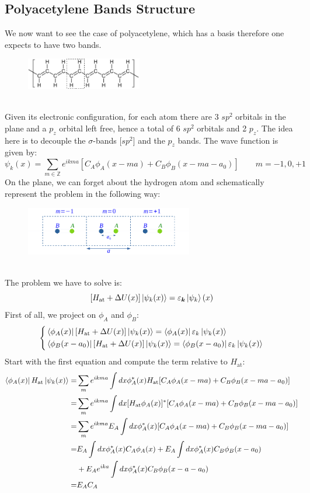 \documentclass[10.75pt,a4paper,openright,bottom=2cm]{article}
\renewcommand{\Vec}[1]{\boldsymbol{#1}}
\begin{document}
\subsection{Polyacetylene Bands Structure}
We now want to see the case of polyacetylene, which has a basis therefore one expects to have two bands.
\begin{figure}[h]
    \centering
    \includegraphics[width=0.45\textwidth]{polyacetylene.pdf}
    \label{fig:polyacetylene}
\end{figure}\\
\noindent
Given its electronic configuration, for each atom there are 3 $sp^2$ orbitals in the plane and a $p_z$ orbital left free, hence a total of 6 $sp^2$ orbitals and 2 $p_z$. The idea here is to decouple the $\sigma$-bands [$sp^2$] and the $p_z$ bands. The wave function is given by:
\[
\psi_k(x)=\sum_{m\in\mathbb{Z}}e^{ikma}[C_A\phi_A(x-ma)+C_B\phi_B(x-ma-a_0)] \qquad m=-1,0,+1
\]
On the plane, we can forget about the hydrogen atom and schematically represent the problem in the following way:
\begin{figure}[h]
    \centering
    \includegraphics[width=0.65\textwidth]{polyscheme.pdf}
    \label{fig:polyscheme}
\end{figure}\\
\noindent
The problem we have to solve is:
\[
[H_{\text{at}}+\Delta U(x)]\ket{\psi_k(x)}=\varepsilon_{\Vec{k}}\ket{\psi_k}(x)
\]
First of all, we project on $\phi_A$ and $\phi_B$:
\[
\left\{
\begin{aligned}
&\bra{\phi_A(x)}[H_{\text{at}}+\Delta U(x)]\ket{\psi_k(x)}=\bra{\phi_A(x)}\varepsilon_k\ket{\psi_k(x)}\\
&\bra{\phi_B(x-a_0)}[H_{\text{at}}+\Delta U(x)]\ket{\psi_k(x)}=\bra{\phi_B(x-a_0)}\varepsilon_k\ket{\psi_k(x)}
\end{aligned}
\right.
\]
Start with the first equation and compute the term relative to $H_{\text{at}}$:
\begin{align*}
\bra{\phi_A(x)}H_{\text{at}}\ket{\psi_k(x)}=&\sum_me^{ikma}\int dx\phi_A^*(x)H_{\text{at}}[C_A\phi_A(x-ma)+C_B\phi_B(x-ma-a_0)]\\
=&\sum_me^{ikma}\int dx[H_{\text{at}}\phi_A(x)]^*[C_A\phi_A(x-ma)+C_B\phi_B(x-ma-a_0)]\\
=&\sum_me^{ikma}E_A\int dx\phi_A^*(x)[C_A\phi_A(x-ma)+C_B\phi_B(x-ma-a_0)]\\
=&E_A\int dx\phi_A^*(x)C_A\phi_A(x)+E_A\int dx\phi_A^*(x)C_B\phi_B(x-a_0)\\
&+E_Ae^{ika}\int dx\phi_A^*(x)C_B\phi_B(x-a-a_0)\\
=&E_AC_A
\end{align*}
\end{document}
